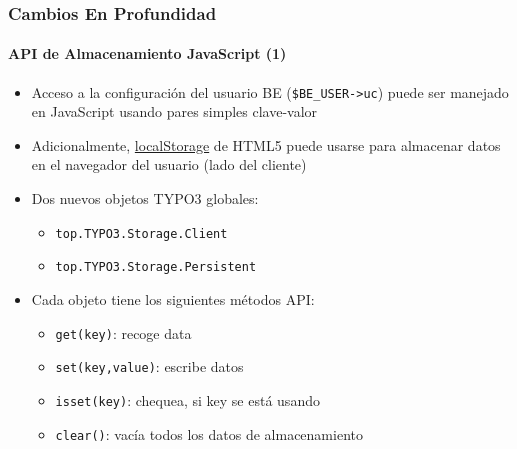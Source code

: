 
\begin{frame}[fragile]
	\frametitle{Cambios En Profundidad}
	\framesubtitle{API de Almacenamiento JavaScript (1)}

	\begin{itemize}
		\item Acceso a la configuración del usuario BE (\texttt{\$BE\_USER->uc}) puede ser manejado
			en JavaScript usando pares simples clave-valor
		\item Adicionalmente, \href{http://www.w3.org/TR/webstorage/}{localStorage} de HTML5
			puede usarse para almacenar datos en el navegador del usuario (lado del cliente)

		\item Dos nuevos objetos TYPO3 globales:
			\begin{itemize}
				\item \texttt{top.TYPO3.Storage.Client}
				\item \texttt{top.TYPO3.Storage.Persistent}
			\end{itemize}

		\item Cada objeto tiene los siguientes métodos API:
			\begin{itemize}
				\item \texttt{get(key)}: recoge data
				\item \texttt{set(key,value)}: escribe datos
				\item \texttt{isset(key)}: chequea, si key se está usando
				\item \texttt{clear()}: vacía todos los datos de almacenamiento
			\end{itemize}

	\end{itemize}

\end{frame}


